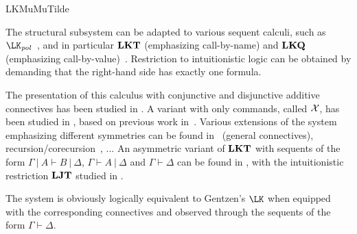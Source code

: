 \begin{entry}{LKMuMuTilde}
\begin{history}
The structural subsystem can be adapted to various sequent calculi,
such as $\LK_{\mathit{pol}}$~\cite{Munch-Maccagnoni09}, and in
particular $\mathbf{LKT}$ (emphasizing call-by-name) and $\mathbf{LKQ}$ (emphasizing
call-by-value)~\cite{DanJoiSch95,DanJoiSch97}. Restriction to
intuitionistic logic can be obtained by demanding that the right-hand
side has exactly one formula.

The presentation of this calculus with conjunctive and disjunctive
additive connectives has been studied in
\cite{Wadler03,Wadler05,HerbelinHdR}. A variant with only commands,
called ${\cal X}$, has been studied in \cite{BakLenLes05}, based on
previous work in~\cite{UrbanPhD}.  Various extensions of the system
emphasizing different symmetries can be found in~\cite{DownenAriola14}
(general connectives), recursion/corecursion~\cite{KimuraTatsuta13},
...  An asymmetric variant of $\mathbf{LKT}$ with sequents of the form $\Gamma
~|~ A \vdash B ~|~ \Delta$, $\Gamma \vdash A ~|~ \Delta$ and $\Gamma
\vdash \Delta$ can be found in \cite{HerbelinPhD}, with the
intuitionistic restriction $\mathbf{LJT}$ studied in \cite{Herbelin94,Kikuchi04}.

\end{history}

\begin{technicalities}
The system is obviously logically equivalent to Gentzen's $\LK$ when
equipped with the corresponding connectives and observed through the
sequents of the form $\Gamma \vdash \Delta$. 
\end{technicalities}


\end{entry}
